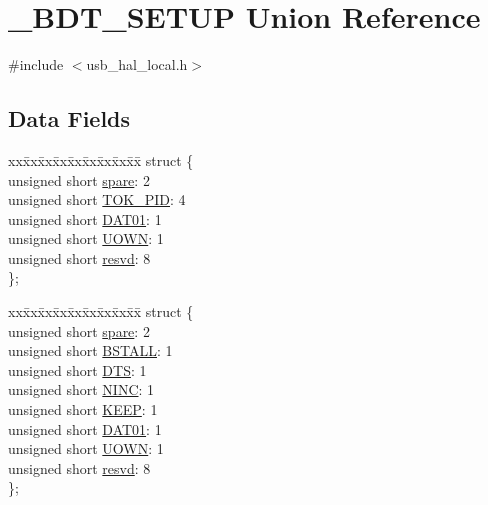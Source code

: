 \hypertarget{union___b_d_t___s_e_t_u_p}{}\section{\+\_\+\+B\+D\+T\+\_\+\+S\+E\+T\+U\+P Union Reference}
\label{union___b_d_t___s_e_t_u_p}


{\ttfamily \#include $<$usb\+\_\+hal\+\_\+local.\+h$>$}

\subsection*{Data Fields}
\begin{DoxyCompactItemize}
\item 
\begin{tabbing}
xx\=xx\=xx\=xx\=xx\=xx\=xx\=xx\=xx\=\kill
struct \{\\
\>unsigned short \hyperlink{union___b_d_t___s_e_t_u_p_a98efda18e7b0a66854cd9b0963832b1a}{spare}: 2\\
\>unsigned short \hyperlink{union___b_d_t___s_e_t_u_p_ab086222f79219297398191e002f9cd19}{TOK\_PID}: 4\\
\>unsigned short \hyperlink{union___b_d_t___s_e_t_u_p_a101e364982c14c1b233fbe03b15c1d73}{DAT01}: 1\\
\>unsigned short \hyperlink{union___b_d_t___s_e_t_u_p_a5580d5dc191e4f973fcfa5feaa34369f}{UOWN}: 1\\
\>unsigned short \hyperlink{union___b_d_t___s_e_t_u_p_ae3dc0e4d24d0518699d8f081ba58f91c}{resvd}: 8\\
\}; \\

\end{tabbing}\item 
\begin{tabbing}
xx\=xx\=xx\=xx\=xx\=xx\=xx\=xx\=xx\=\kill
struct \{\\
\>unsigned short \hyperlink{union___b_d_t___s_e_t_u_p_a98efda18e7b0a66854cd9b0963832b1a}{spare}: 2\\
\>unsigned short \hyperlink{union___b_d_t___s_e_t_u_p_add9b71093ed94ddedd31285a91417aed}{BSTALL}: 1\\
\>unsigned short \hyperlink{union___b_d_t___s_e_t_u_p_a69624ece58353b56293b8150da598990}{DTS}: 1\\
\>unsigned short \hyperlink{union___b_d_t___s_e_t_u_p_a177d11889700158408ddca57d2c6be17}{NINC}: 1\\
\>unsigned short \hyperlink{union___b_d_t___s_e_t_u_p_a70b1f74d0c1dfde56ac224bfc0278422}{KEEP}: 1\\
\>unsigned short \hyperlink{union___b_d_t___s_e_t_u_p_a101e364982c14c1b233fbe03b15c1d73}{DAT01}: 1\\
\>unsigned short \hyperlink{union___b_d_t___s_e_t_u_p_a5580d5dc191e4f973fcfa5feaa34369f}{UOWN}: 1\\
\>unsigned short \hyperlink{union___b_d_t___s_e_t_u_p_ae3dc0e4d24d0518699d8f081ba58f91c}{resvd}: 8\\
\}; \\


\end{tabbing}
\end{DoxyCompactItemize}
